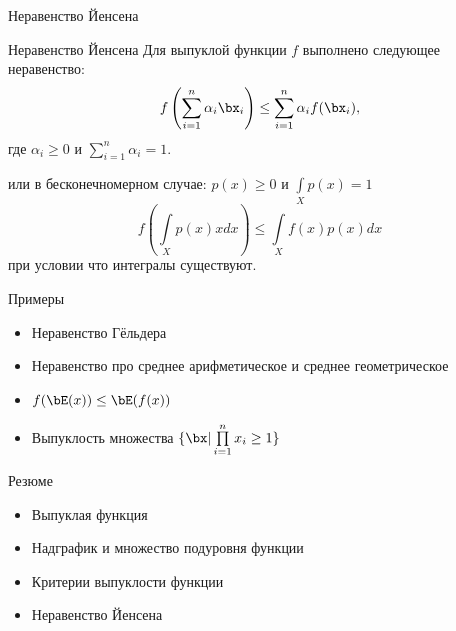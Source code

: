 \documentclass[12pt,russian]{beamer}
\begin{document}
\begin{frame}{Неравенство Йенсена}
 
\begin{block}{Неравенство Йенсена}
Для выпуклой функции $f$ выполнено следующее неравенство:
\vspace{-4mm}
\[
f\left( \sum\limits_{i=1}^n \alpha_i \bx_i \right) \leq \sum\limits_{i=1}^n \alpha_i f(\bx_i),
\vspace{-4mm}
\] 
где $\alpha_i \geq 0$ и $\sum\limits_{i=1}^n \alpha_i = 1$.
\end{block}

или в бесконечномерном случае: $p(x) \geq 0$ и $\int\limits_X p(x) = 1$ 
\vspace{-4mm}
\[
f\left( \int\limits_X p(x)xdx \right) \leq \int\limits_X f(x)p(x)dx
\]
при условии что интегралы существуют.

\end{frame}

\begin{frame}{Примеры}
\begin{itemize}
\item Неравенство Гёльдера
\item Неравенство про среднее арифметическое и среднее геометрическое
\item $f(\bE(x)) \leq \bE(f(x))$
\item Выпуклость множества $\{ \bx | \prod\limits_{i=1}^n x_i \geq 1 \}$
\end{itemize}
\end{frame}

\begin{frame}{Резюме}
\begin{itemize}
\item Выпуклая функция
\item Надграфик и множество подуровня функции
\item Критерии выпуклости функции
\item Неравенство Йенсена
\end{itemize}
\end{frame}
\end{document}
